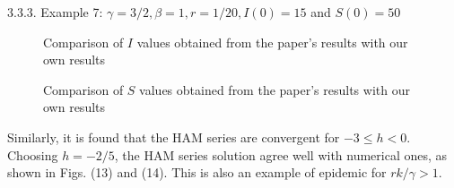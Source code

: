 \documentclass[10pt]{article}
\begin{document}
3.3.3. Example 7: $\gamma=3 / 2, \beta=1, r=1 / 20, I(0)=15$ and $S(0)=50$
 \begin{figure}[!htbp]
  \centering
  \hfill
  \caption{Comparison of \(I\) values obtained from the paper's results with our own results  }
\end{figure}
\begin{figure}[!htbp]
  \centering
  \hfill
  \caption{Comparison of \(S\) values obtained from the paper's results with our own results  }
\end{figure}
Similarly, it is found that the  HAM series are convergent for $-3 \leqslant h<0$. Choosing $h=-2 / 5$, the HAM series solution agree well with numerical ones, as shown in Figs. (13) and (14). This is also an example of epidemic for $r k / \gamma>1$.
\end{document}
